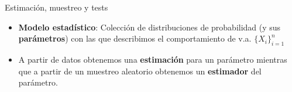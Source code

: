 \documentclass{beamer}
\makeatletter
\theoremstyle{definition}
\def\munderbar#1{\underline{\sbox\tw@{$#1$}\dp\tw@\z@\box\tw@}}
\makeatother
\begin{document}
\begin{frame}[fragile]{\color{rosee}Estimaci\'on, muestreo y tests}
  
     \begin{itemize}
\item\small{ \textbf{Modelo estadístico}: Colección de distribuciones de probabilidad (y sus \textbf{parámetros}) con las que describimos el comportamiento de v.a. $\{X_i\}_{i=1}^{n}$}\medskip

\item  \small{A partir de datos obtenemos una \textbf{estimación} para un parámetro mientras que a partir de un muestreo aleatorio obtenemos un \textbf{estimador} del parámetro.}\medskip
  \end{itemize}

\end{frame}
\end{document}
